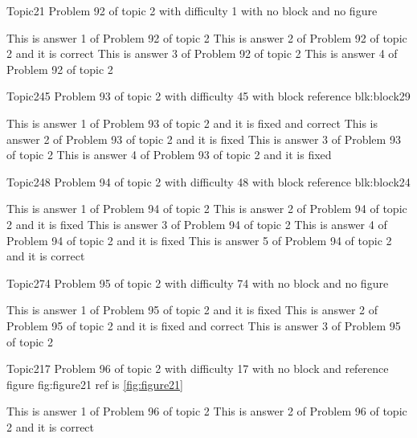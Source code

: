 \documentclass[master]{exam}
\begin{document}
\begin{problem}{Topic2}{1}
	Problem 92 of topic 2 with difficulty 1 with no block and no figure
	\begin{answers}
		\answer This is answer 1 of Problem 92 of topic 2 
		\answer[correct] This is answer 2 of Problem 92 of topic 2 and it is correct
		\answer This is answer 3 of Problem 92 of topic 2 
		\answer This is answer 4 of Problem 92 of topic 2 
	\end{answers}
\end{problem}

\begin{problem}[requires=blk:block29]{Topic2}{45}
	Problem 93 of topic 2 with difficulty 45 with block reference blk:block29
	\begin{answers}
		 This is answer 1 of Problem 93 of topic 2 and it is fixed and correct
		\answer[fixed] This is answer 2 of Problem 93 of topic 2 and it is fixed
		\answer This is answer 3 of Problem 93 of topic 2 
		\answer[fixed] This is answer 4 of Problem 93 of topic 2 and it is fixed
	\end{answers}
\end{problem}

\begin{problem}[requires=blk:block24]{Topic2}{48}
	Problem 94 of topic 2 with difficulty 48 with block reference blk:block24
	\begin{answers}
		\answer This is answer 1 of Problem 94 of topic 2 
		\answer[fixed] This is answer 2 of Problem 94 of topic 2 and it is fixed
		\answer This is answer 3 of Problem 94 of topic 2 
		\answer[fixed] This is answer 4 of Problem 94 of topic 2 and it is fixed
		\answer[correct] This is answer 5 of Problem 94 of topic 2 and it is correct
	\end{answers}
\end{problem}

\begin{problem}{Topic2}{74}
	Problem 95 of topic 2 with difficulty 74 with no block and no figure
	\begin{answers}
		\answer[fixed] This is answer 1 of Problem 95 of topic 2 and it is fixed
		 This is answer 2 of Problem 95 of topic 2 and it is fixed and correct
		\answer This is answer 3 of Problem 95 of topic 2 
	\end{answers}
\end{problem}

\begin{problem}{Topic2}{17}
	Problem 96 of topic 2 with difficulty 17 with no block and reference figure fig:figure21 ref is \ref{fig:figure21}
	\begin{answers}
		\answer This is answer 1 of Problem 96 of topic 2 
		\answer[correct] This is answer 2 of Problem 96 of topic 2 and it is correct
	\end{answers}
\end{problem}
\end{document}
